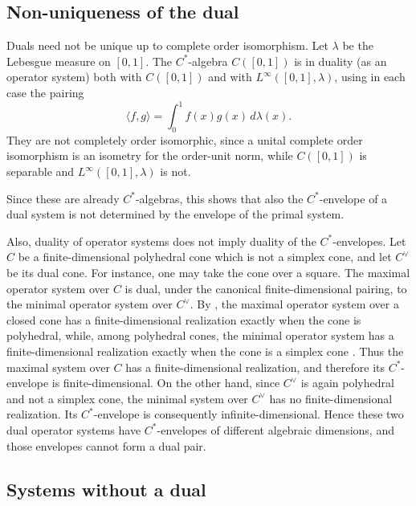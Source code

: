 \documentclass[11pt,onecolumn]{article}
\theoremstyle{plain}
\theoremstyle{definition}
\begin{document}
\subsection{Non-uniqueness of the dual}
Duals need not be unique up to complete order isomorphism.  Let
 $\lambda$ be the Lebesgue measure on $[0,1]$.  The $C^*$-algebra
$C([0,1])$ is in duality (as an operator system) both with $C([0,1])$ and with
$L^\infty([0,1],\lambda)$, using in each case the pairing
\[
    \langle f,g\rangle=\int_0^1 f(x)g(x)\,d\lambda(x).
\]
They are not completely order isomorphic, since a unital complete order isomorphism is an isometry for the order-unit norm, while
$C([0,1])$ is separable and $L^\infty([0,1],\lambda)$ is not.

Since these are already $C^*$-algebras, this shows that also the  $C^*$-envelope of a dual system is not determined by the envelope of the primal system.

Also, duality of operator systems does not imply duality of the $C^*$-envelopes.
Let $C$ be a finite-dimensional
polyhedral cone which is not a simplex cone, and let $C^\vee$ be its dual
cone.  For instance, one may take the cone over a square.  The maximal
operator system over $C$ is dual, under the canonical finite-dimensional
pairing, to the minimal operator system over $C^\vee$.
By \cite{FritzNetzerThom2017}, the maximal operator system over a
closed cone has a finite-dimensional realization exactly when the cone is
polyhedral, while, among polyhedral cones, the minimal operator system has a
finite-dimensional realization exactly when the cone is a simplex cone
\cite{FritzNetzerThom2017}.  Thus the maximal system over $C$ has a
finite-dimensional realization, and therefore its $C^*$-envelope is
finite-dimensional.  On the other hand, since $C^\vee$ is again polyhedral
and not a simplex cone, the minimal system over $C^\vee$ has no
finite-dimensional realization.  Its $C^*$-envelope is consequently
infinite-dimensional.  Hence these two dual operator systems have $C^*$-envelopes of
different algebraic dimensions, and those envelopes cannot form a
dual pair.

\subsection{Systems without a dual}
\end{document}
